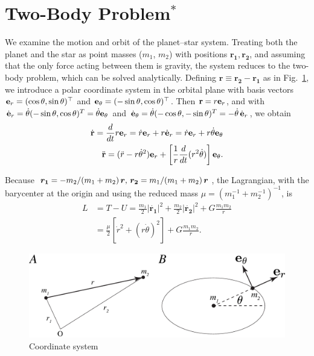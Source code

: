 \section{Two-Body Problem$^\ast$ \label{ss:twobody}}

We examine the motion and orbit of the planet–star system. Treating both the planet and the star as point masses ($m_1$, $m_2$) with positions ${\boldsymbol{r_1}},{\boldsymbol{ r_2}}$, and assuming that the only force acting between them is gravity, the system reduces to the two-body problem, which can be solved analytically. Defining ${\boldsymbol{ r}} \equiv {\boldsymbol{r_2}} - {\boldsymbol{ r_1}}$ as in Fig.~\ref{fig:zahyou}, we introduce a polar coordinate system in the orbital plane with basis vectors ${\bf e}_r=(\cos{\theta}, \sin{\theta})^\top$ and ${\bf e}_\theta=(-\sin{\theta}, \cos{\theta})^\top$. Then ${\bf r} = r {\bf e}_r$, and with $\dot{{\bf e}}_r=\dot{\theta} (-\sin{\theta}, \cos{\theta})^T = \dot{\theta} {\bf e}_\theta $ and $\dot{{\bf e}}_\theta=\dot{\theta}(-\cos{\theta}, -\sin{\theta})^T = - \dot{\theta} \,\dot{{\bf e}}_r$, we obtain
\begin{align}
\label{eq:speconv1}
\dot{\bf r} = \frac{d}{dt}{r {\bf e}_r} = \dot{r} {\bf e}_r + r \dot{{\bf e}}_r = \dot{r} {\bf e}_r + r \dot{\theta} {\bf e}_\theta \\
\ddot{\bf r} = (\ddot{r} - r \dot{\theta}^2 ) {\bf e}_r + \left[ \frac{1}{r} \frac{d}{dt} (r^2 \dot{\theta} ) \right] {\bf e}_\theta .
\end{align}

Because $\boldsymbol{r_1}=-m_2/(m_1+m_2) \, \boldsymbol{r}, \, \boldsymbol{r_2}= m_1/(m_1 + m_2) \,\boldsymbol{r}$, the Lagrangian, with the barycenter at the origin and using the reduced mass $\mu = (m_1^{-1} + m_2^{-1})^{-1}$, is
\begin{align}
L &= T - U = \frac{m_1}{2} |\dot{\boldsymbol{r_1}}|^2 + \frac{m_2}{2} |\dot{\boldsymbol{r_2}}|^2 + G \frac{m_1 m_2}{r} \nonumber \\
&= \frac{\mu}{2} [ \dot{r}^2 + (r \dot{\theta})^2 ] + G \frac{m_1 m_2}{r}.
\end{align}

\begin{figure}[]
 \begin{center}
	\includegraphics[width=\linewidth]{fig/zahyou.eps}
\end{center}
	\caption{Coordinate system}
	\label{fig:zahyou}
\end{figure} 


